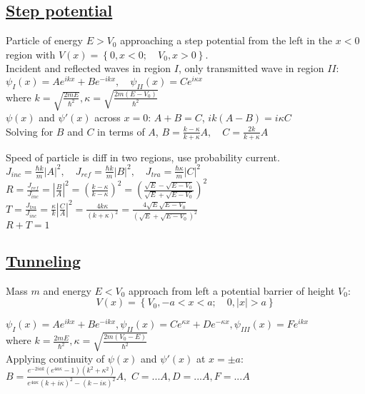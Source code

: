 \subsection{\underline{Step potential}}
Particle of energy $E > V_0$ approaching a step potential from the left in the $x < 0$ region with $V(x) = \left\{ 0, x < 0; \quad V_0, x > 0 \right\}.$ \\

Incident and reflected waves in region $I$, only transmitted wave in region $II$:
$\psi_{I}(x) = Ae^{ikx} + Be^{-ikx}, \quad \psi_{II}(x) = Ce^{i\kappa x}$ \\
where $k = \sqrt{\frac{2mE}{\hbar^2}}, \kappa = \sqrt{\frac{2m(E - V_0)}{\hbar^2}}$ \\

$\psi(x)$ and $\psi'(x)$ across $x = 0$: $A+B=C$, $ik(A-B) = i \kappa C$ \\
Solving for $B$ and $C$ in terms of $A$, $B= \frac{k - \kappa}{k + \kappa} A, \quad C = \frac{2k}{k + \kappa} A$

Speed of particle is diff in two regions, use probability current. \\
$J_{inc} = \frac{\hbar k}{m} |A|^2, \quad J_{ref} = \frac{\hbar k}{m} |B|^2, \quad J_{tra} = \frac{\hbar \kappa}{m} |C|^2$ \\

$R = \frac{J_{ref}}{J_{inc}} = |\frac{B}{A}|^2 = (\frac{k - \kappa}{k - \kappa})^2 = (\frac{\sqrt{E} - \sqrt{E - V_0}}{\sqrt{E} + \sqrt{E - V_0}})^2$ \\
$T = \frac{J_{tra}}{J_{inc}} = \frac{\kappa}{k} |\frac{C}{A}|^2 = \frac{4k \kappa}{(k+\kappa)^2} = \frac{4 \sqrt{E} \sqrt{E - V_0}}{(\sqrt{E} + \sqrt{E - V_0})^2}$ \\
$R + T = 1$

\subsection{\underline{Tunneling}}
Mass $m$ and energy $E < V_0$ approach from left a potential barrier of height $V_0$:
$$V(x) = \left\{ V_0, -a < x < a; \quad 0, |x| > a \right\}$$

$\psi_{I}(x) = Ae^{ikx} + Be^{-ikx}, \psi_{II}(x) = Ce^{\kappa x} + De^{-\kappa x}, \psi_{III}(x) = Fe^{ikx}$ \\
where $k = \frac{2mE}{\hbar^2}, \kappa = \sqrt{\frac{2m(V_0 - E)}{\hbar^2}}$ \\

Applying continuity of $\psi(x)$ and $\psi'(x)$ at $x = \pm a$:
    $B = \frac{e^{-2iak}(e^{4a\kappa} - 1)(k^2 + \kappa^2)}{e^{4a\kappa} (k + i\kappa)^2 - (k - i \kappa)^2} A,$
    $C = ...A, D = ... A, F = ...A$

